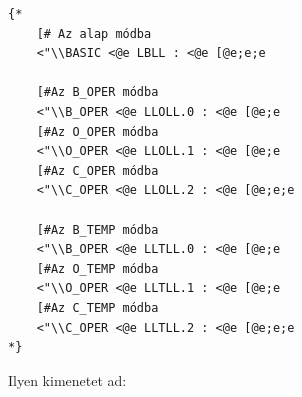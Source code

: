 \begin{verbatim}
{* 
    [# Az alap módba
	<"\\BASIC <@e LBLL : <@e [@e;e;e
	
	[#Az B_OPER módba
	<"\\B_OPER <@e LLOLL.0 : <@e [@e;e
	[#Az O_OPER módba
	<"\\O_OPER <@e LLOLL.1 : <@e [@e;e
	[#Az C_OPER módba
	<"\\C_OPER <@e LLOLL.2 : <@e [@e;e;e
	
	[#Az B_TEMP módba
	<"\\B_OPER <@e LLTLL.0 : <@e [@e;e
	[#Az O_TEMP módba
	<"\\O_OPER <@e LLTLL.1 : <@e [@e;e
	[#Az C_TEMP módba
	<"\\C_OPER <@e LLTLL.2 : <@e [@e;e;e
*}
\end{verbatim}

Ilyen kimenetet ad:


